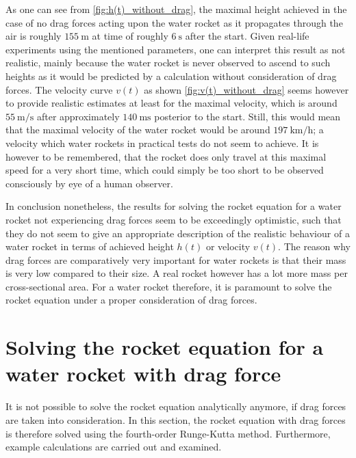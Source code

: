 \documentclass[a4paper,11pt]{report}
\begin{document}
As one can see from \cref{fig:h(t)_without_drag}, the maximal height achieved in the case of no drag forces acting upon the water rocket as it propagates through the air is roughly $\SI{155}{\meter}$ at time of roughly $\SI{6}{\second}$ after the start. Given real-life experiments using the mentioned parameters, one can interpret this result as not realistic, mainly because the water rocket is never observed to ascend to such heights as it would be predicted by a calculation without consideration of drag forces. The velocity curve $v(t)$ as shown \cref{fig:v(t)_without_drag} seems however to provide realistic estimates at least for the maximal velocity, which is around $\SI{55}{\meter\per\second}$ after approximately $\SI{140}{\milli\second}$ posterior to the start. Still, this would mean that the maximal velocity of the water rocket would be around $\SI{197}{\kilo\meter\per\hour}$; a velocity which water rockets in practical tests do not seem to achieve. It is however to be remembered, that the rocket does only travel at this maximal speed for a very short time, which could simply be too short to be observed consciously by eye of a human observer.

In conclusion nonetheless, the results for solving the rocket equation for a water rocket not experiencing drag forces seem to be exceedingly optimistic, such that they do not seem to give an appropriate description of the realistic behaviour of a water rocket in terms of achieved height $h(t)$ or velocity $v(t)$. The reason why drag forces are comparatively very important for water rockets is that their mass is very low compared to their size. A real rocket however has a lot more mass per cross-sectional area. For a water rocket therefore, it is paramount to solve the rocket equation under a proper consideration of drag forces.

\section{Solving the rocket equation for a water rocket with drag force}
It is not possible to solve the rocket equation analytically anymore, if drag forces are taken into consideration. In this section, the rocket equation with drag forces is therefore solved using the fourth-order Runge-Kutta method. Furthermore, example calculations are carried out and examined.
\end{document}
